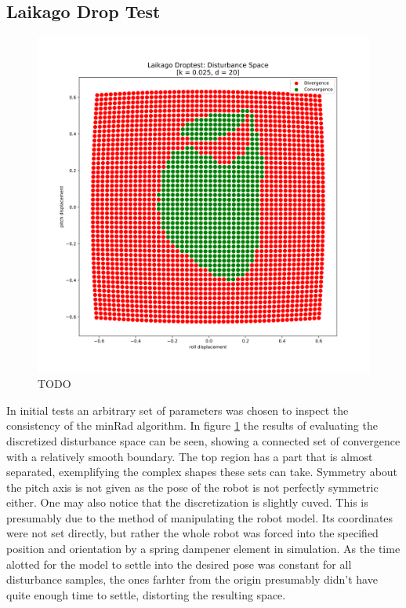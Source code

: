     \subsection{Laikago Drop Test}
    \begin{figure}[hb]
    \centering
    \includegraphics[width=.7\linewidth]{figures/droptest_ds_v2.png}
    \caption{TODO}
    \label{fig:drop}
    \end{figure}    
    In initial tests an arbitrary set of parameters was chosen to inspect the consistency of the minRad algorithm. In figure \ref{fig:drop} the results of evaluating the discretized disturbance space can be seen, showing a connected set of convergence with a relatively smooth boundary. The top region has a part that is almost separated, exemplifying the complex shapes these sets can take. Symmetry about the pitch axis is not given as the pose of the robot is not perfectly symmetric either. One may also notice that the discretization is slightly cuved. This is presumably due to the method of manipulating the robot model. Its coordinates were not set directly, but rather the whole robot was forced into the specified position and orientation by a spring dampener element in simulation. As the time alotted for the model to settle into the desired pose was constant for all disturbance samples, the ones farhter from the origin presumably didn't have quite enough time to settle, distorting the resulting space.
    
